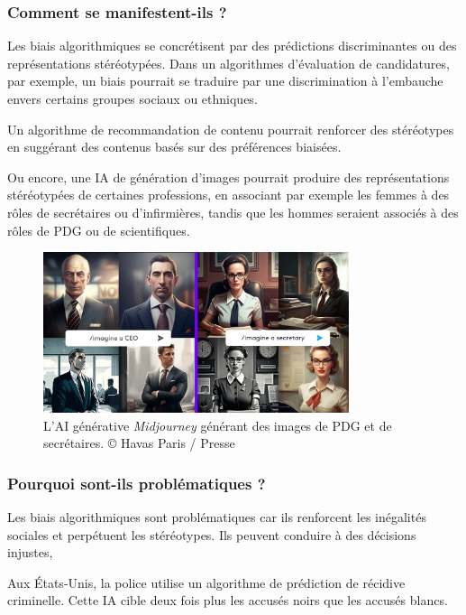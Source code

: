 \documentclass[12pt, letterpaper]{article}
\begin{document}
    \subsubsection*{Comment se manifestent-ils ?} 
    Les biais algorithmiques se concrétisent par des prédictions discriminantes ou des représentations stéréotypées.
    Dans un algorithmes d'évaluation de candidatures, par exemple, un biais pourrait se traduire par une discrimination à l'embauche envers certains groupes sociaux ou ethniques.

    Un algorithme de recommandation de contenu pourrait renforcer des stéréotypes en suggérant des contenus basés sur des préférences biaisées.
    
    Ou encore, une IA de génération d'images pourrait produire des représentations stéréotypées de certaines professions, en associant par exemple les femmes à des rôles de secrétaires ou d'infirmières, tandis que les hommes seraient associés à des rôles de PDG ou de scientifiques.


    \begin{figure}[h]
        \centering
        \includegraphics[width=0.8\textwidth]{midjourney-biaised}
        \caption{L'AI générative \emph{Midjourney} générant des images de PDG et de secrétaires. © Havas Paris / Presse}
    \end{figure}


    \subsubsection*{Pourquoi sont-ils problématiques ?}
    Les biais algorithmiques sont problématiques car ils renforcent les inégalités sociales et perpétuent les stéréotypes. Ils peuvent conduire à des décisions injustes, 

    Aux États-Unis, la police utilise un algorithme de prédiction de récidive criminelle. Cette IA cible deux fois plus les accusés noirs que les accusés blancs. \cite{penal}
\end{document}
